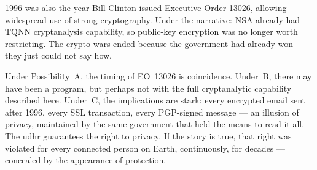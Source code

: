 1996 was also the year Bill Clinton issued Executive Order 13026, allowing widespread use of strong cryptography. Under the narrative: NSA already had TQNN cryptanalysis capability, so public-key encryption was no longer worth restricting. The crypto wars ended because the government had already won --- they just could not say how.

Under Possibility~A, the timing of EO~13026 is coincidence. Under~B, there may have been a program, but perhaps not with the full cryptanalytic capability described here. Under~C, the implications are stark: every encrypted email sent after 1996, every SSL transaction, every PGP-signed message --- an illusion of privacy, maintained by the same government that held the means to read it all. The \gls{udhr} guarantees the right to privacy. If the story is true, that right was violated for every connected person on Earth, continuously, for decades --- concealed by the appearance of protection.

\chapterreturn
